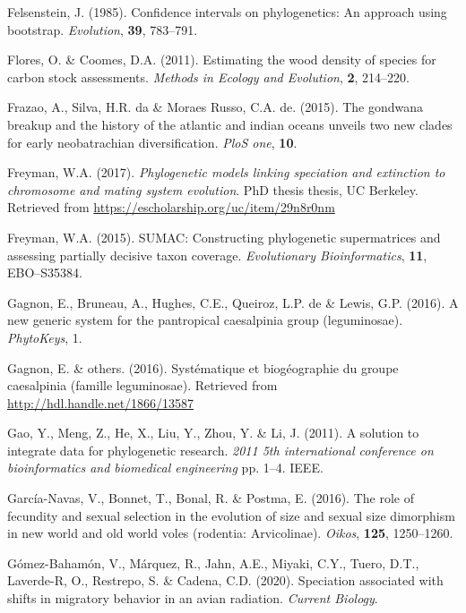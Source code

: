 \documentclass[]{article}
\begin{document}
\leavevmode\hypertarget{ref-felsenstein1985confidence}{}%
Felsenstein, J. (1985). Confidence intervals on phylogenetics: An approach using bootstrap. \emph{Evolution}, \textbf{39}, 783--791.

\leavevmode\hypertarget{ref-flores2011estimating}{}%
Flores, O. \& Coomes, D.A. (2011). Estimating the wood density of species for carbon stock assessments. \emph{Methods in Ecology and Evolution}, \textbf{2}, 214--220.

\leavevmode\hypertarget{ref-frazao2015gondwana}{}%
Frazao, A., Silva, H.R. da \& Moraes Russo, C.A. de. (2015). The gondwana breakup and the history of the atlantic and indian oceans unveils two new clades for early neobatrachian diversification. \emph{PloS one}, \textbf{10}.

\leavevmode\hypertarget{ref-freyman2017phylogenetic}{}%
Freyman, W.A. (2017). \emph{Phylogenetic models linking speciation and extinction to chromosome and mating system evolution}. PhD thesis thesis, UC Berkeley. Retrieved from \url{https://escholarship.org/uc/item/29n8r0nm}

\leavevmode\hypertarget{ref-freyman2015sumac}{}%
Freyman, W.A. (2015). SUMAC: Constructing phylogenetic supermatrices and assessing partially decisive taxon coverage. \emph{Evolutionary Bioinformatics}, \textbf{11}, EBO--S35384.

\leavevmode\hypertarget{ref-gagnon2016new}{}%
Gagnon, E., Bruneau, A., Hughes, C.E., Queiroz, L.P. de \& Lewis, G.P. (2016). A new generic system for the pantropical caesalpinia group (leguminosae). \emph{PhytoKeys}, 1.

\leavevmode\hypertarget{ref-gagnon2016systematique}{}%
Gagnon, E. \& others. (2016). Systématique et biogéographie du groupe caesalpinia (famille leguminosae). Retrieved from \url{http://hdl.handle.net/1866/13587}

\leavevmode\hypertarget{ref-gao2011solution}{}%
Gao, Y., Meng, Z., He, X., Liu, Y., Zhou, Y. \& Li, J. (2011). A solution to integrate data for phylogenetic research. \emph{2011 5th international conference on bioinformatics and biomedical engineering} pp. 1--4. IEEE.

\leavevmode\hypertarget{ref-garcia2016role}{}%
García-Navas, V., Bonnet, T., Bonal, R. \& Postma, E. (2016). The role of fecundity and sexual selection in the evolution of size and sexual size dimorphism in new world and old world voles (rodentia: Arvicolinae). \emph{Oikos}, \textbf{125}, 1250--1260.

\leavevmode\hypertarget{ref-gomez2020speciation}{}%
Gómez-Bahamón, V., Márquez, R., Jahn, A.E., Miyaki, C.Y., Tuero, D.T., Laverde-R, O., Restrepo, S. \& Cadena, C.D. (2020). Speciation associated with shifts in migratory behavior in an avian radiation. \emph{Current Biology}.
\end{document}
